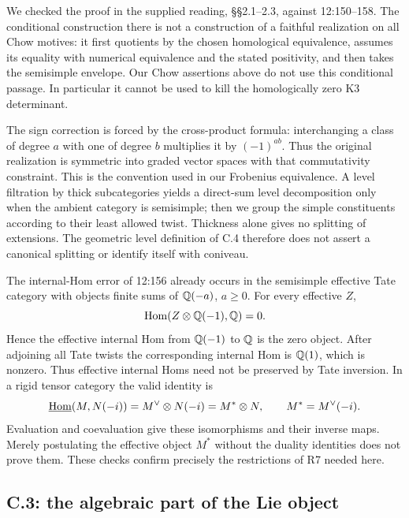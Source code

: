 \begin{remark}
\label{c:r7-audit}
We checked the proof in the supplied reading, \S\S2.1--2.3, against 12:150--158. The conditional construction there is not a construction of a faithful realization on all Chow motives: it first quotients by the chosen homological equivalence, assumes its equality with numerical equivalence and the stated positivity, and then takes the semisimple envelope. Our Chow assertions above do not use this conditional passage. In particular it cannot be used to kill the homologically zero K3 determinant.

The sign correction is forced by the cross-product formula: interchanging a class of degree $a$ with one of degree $b$ multiplies it by $(-1)^{ab}$. Thus the original realization is symmetric into graded vector spaces with that commutativity constraint. This is the convention used in our Frobenius equivalence. A level filtration by thick subcategories yields a direct-sum level decomposition only when the ambient category is semisimple; then we group the simple constituents according to their least allowed twist. Thickness alone gives no splitting of extensions. The geometric level definition of C.4 therefore does not assert a canonical splitting or identify itself with coniveau.

The internal-Hom error of 12:156 already occurs in the semisimple effective Tate category with objects finite sums of $\mathbb Q(-a)$, $a\geq0$. For every effective $Z$,
\[
 \operatorname{Hom}(Z\otimes\mathbb Q(-1),\mathbb Q)=0.
\]
Hence the effective internal Hom from $\mathbb Q(-1)$ to $\mathbb Q$ is the zero object. After adjoining all Tate twists the corresponding internal Hom is $\mathbb Q(1)$, which is nonzero. Thus effective internal Homs need not be preserved by Tate inversion. In a rigid tensor category the valid identity is
\[
 \underline{\operatorname{Hom}}(M,N(-i))
 =M^\vee\otimes N(-i)
 =M^*\otimes N,
 \qquad M^*=M^\vee(-i).
\]
Evaluation and coevaluation give these isomorphisms and their inverse maps. Merely postulating the effective object $M^*$ without the duality identities does not prove them. These checks confirm precisely the restrictions of R7 needed here.
\end{remark}

\subsection{C.3: the algebraic part of the Lie object}

